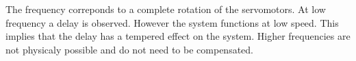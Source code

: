 

The frequency correponds to a complete rotation of the servomotors. At low frequency a delay is observed. However the system functions at low speed. This implies that the delay has a tempered effect on the system. Higher frequencies are not physicaly possible and do not need to be compensated.

